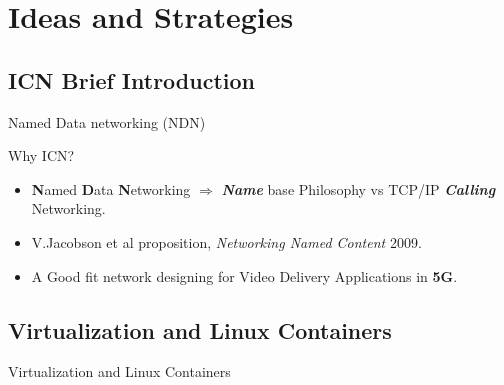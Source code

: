 \documentclass[8pt]{beamer}
\newcommand{\1}{\mathbbm 1}
\begin{document}
\section{Ideas and Strategies}

\subsection{ICN Brief Introduction}

\begin{frame}{Named Data networking (NDN)}

Why ICN?

\begin{itemize}
\item \textbf{N}amed \textbf{D}ata \textbf{N}etworking $\Rightarrow$ \textit{\textbf{Name}} base Philosophy vs TCP/IP \textit{\textbf{Calling}} Networking.

\item V.Jacobson et al proposition, \textit{Networking Named Content} 2009.

\item A Good fit network designing for Video Delivery Applications in \textbf{5G}.

\end{itemize}

\end{frame}


\subsection{Virtualization and Linux Containers}



\begin{frame}{Virtualization and Linux Containers}

\end{frame}
\end{document}
